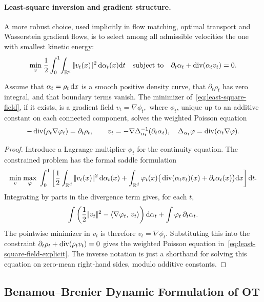 \paragraph{Least-square inversion and gradient structure.}
A more robust choice, used implicitly in flow matching, optimal transport and Wasserstein gradient flows, is to select among all admissible velocities the one with smallest kinetic energy:
\begin{equation}\label{eq:least-square-field}
\underset{v}{\min}\;
\frac12\int_0^1\!\int_{\mathbb{R}^d}|\!| v_t(x) |\!|^2\,\mathrm{d}\alpha_t(x)\mathrm{d} t
\quad
\text{subject to}
\quad
\partial_t\alpha_t+\operatorname{div}(\alpha_t v_t)=0.
\end{equation}
\begin{prop}\label{prop-least-square-gradient-velocity}
Assume that $\alpha_t=\rho_t\,\mathrm{d} x$ is a smooth positive density curve, that $\partial_t\rho_t$ has zero integral, and that boundary terms vanish. The minimizer of~\eqref{eq:least-square-field}, if it exists, is a gradient field
\(v_t=\nabla\phi_t,\)
where $\phi_t$, unique up to an additive constant on each connected component, solves the weighted Poisson equation
\begin{equation}\label{eq:least-square-field-explicit}
-\operatorname{div}(\rho_t\nabla\varphi_t)=\partial_t\rho_t,
\qquad
v_t=-\nabla\Delta_{\alpha_t}^{-1}(\partial_t\alpha_t),
\quad
\Delta_{\alpha_t}\varphi=\operatorname{div}(\alpha_t\nabla\varphi).
\end{equation}
\end{prop}
\begin{proof}
Introduce a Lagrange multiplier $\phi_t$ for the continuity equation. The constrained problem has the formal saddle formulation
\[
\underset{v}{\min}\;\underset{\varphi}{\max}\;
\int_0^1
\left[
\frac12\int_{\mathbb{R}^d}|\!| v_t(x) |\!|^2\,\mathrm{d}\alpha_t(x)
+\int_{\mathbb{R}^d}\varphi_t(x)\big(\operatorname{div}(\alpha_t v_t)(x)+\partial_t\alpha_t(x)\big)\mathrm{d} x
\right]\mathrm{d} t.
\]
Integrating by parts in the divergence term gives, for each $t$,
\[
\int \left(\frac12|\!| v_t |\!|^2-\langle \nabla\varphi_t,\,v_t\rangle\right)\mathrm{d}\alpha_t
+
\int \varphi_t\,\partial_t\alpha_t.
\]
The pointwise minimizer in $v_t$ is therefore $v_t=\nabla\phi_t$. Substituting this into the constraint $\partial_t\rho_t+\operatorname{div}(\rho_t v_t)=0$ gives the weighted Poisson equation in~\eqref{eq:least-square-field-explicit}. The inverse notation is just a shorthand for solving this equation on zero-mean right-hand sides, modulo additive constants.
\end{proof}
\subsection{Benamou--Brenier Dynamic Formulation of OT}
\label{sec-benamou-brenier-dynamic}
